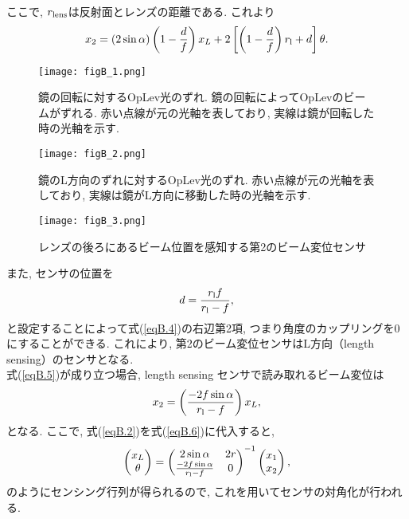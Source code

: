 ここで, $r_{\rm lens}$は反射面とレンズの距離である. これより
\begin{equation}
x_2=(2\sin\alpha)\left(1-\frac{d}{f}\right)x_L+2\left[\left(1-\frac{d}{f}\right)r_{\rm l}+d\right]\theta.
\label{eqB.4}
\end{equation}
\clearpage
\begin{figure}[H]
\begin{center}
\texttt{[image: figB\_1.png]} 
\caption[鏡の回転に対するOpLev光のずれ]{鏡の回転に対するOpLev光のずれ. 鏡の回転によってOpLevのビームがずれる. 赤い点線が元の光軸を表しており, 実線は鏡が回転した時の光軸を示す. }
\label{figB.1}
\end{center}
\end{figure}
\begin{figure}[H]
\begin{center}
\texttt{[image: figB\_2.png]} 
\caption[鏡のL方向のずれに対するOpLev光のずれ]{鏡のL方向のずれに対するOpLev光のずれ. 赤い点線が元の光軸を表しており, 実線は鏡がL方向に移動した時の光軸を示す. }
\label{figB.2}
\end{center}
\end{figure}
\begin{figure}[H]
\begin{center}
\texttt{[image: figB\_3.png]} 
\caption[レンズの後ろにあるビーム位置を感知する第2のビーム変位センサ]{レンズの後ろにあるビーム位置を感知する第2のビーム変位センサ}
\label{figB.3}
\end{center}
\end{figure}
\clearpage
\noindent
また, センサの位置を
\begin{equation}
d=\frac{r_{\rm l}f}{r_{\rm l}-f},
\label{eqB.5}
\end{equation}
と設定することによって式(\ref{eqB.4})の右辺第2項, つまり角度のカップリングを0にすることができる. これにより, 第2のビーム変位センサはL方向（length sensing）のセンサとなる. \\
\quad 式(\ref{eqB.5})が成り立つ場合, length sensing センサで読み取れるビーム変位は
\begin{equation}
x_2=\left(\frac{-2f\sin\alpha}{r_{\rm l}-f}\right)x_L,
\label{eqB.6}
\end{equation}
となる. ここで, 式(\ref{eqB.2})を式(\ref{eqB.6})に代入すると, 
\begin{equation}
\begin{pmatrix}
x_L\\
\theta
\end{pmatrix}
=
\begin{pmatrix}
2\sin\alpha&2r\\
\frac{-2f\sin\alpha}{r_{\rm l}-f}&0
\end{pmatrix}
^{-1}
\begin{pmatrix}
x_1\\
x_2
\end{pmatrix},
\end{equation}
のようにセンシング行列が得られるので, これを用いてセンサの対角化が行われる. 

